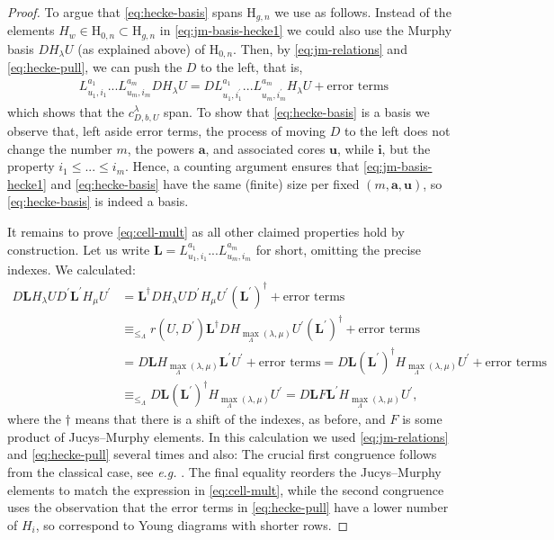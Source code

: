 \documentclass[a4paper,11pt]{amsart}
\newcommand{\eg}{\textsl{e.g.}}
\renewcommand{\dots}{\text{...}}
\newcommand{\setstuff}[1]{\mathrm{#1}}
\newcommand{\bsym}[1]{\boldsymbol{#1}}
\newcommand{\jm}{L}
\numberwithin{equation}{section}
\begin{document}
\begin{proof}
To argue that \eqref{eq:hecke-basis} spans
$\setstuff{H}_{g,n}$ we use \cite[Proposition 3.16]{Ma-hecke-schur} as follows.
Instead of the elements $H_{w}\in\setstuff{H}_{0,n}\subset
\setstuff{H}_{g,n}$ in \eqref{eq:jm-basis-hecke1} we could 
also use the Murphy basis $DH_{\lambda}U$ (as explained above) of $\setstuff{H}_{0,n}$. Then, by 
\eqref{eq:jm-relations} and \eqref{eq:hecke-pull}, we can push 
the $D$ to the left, that is, 
\begin{gather*}
\jm_{u_{1}^{},i_{1}}^{a_{1}}\dots 
\jm_{u_{m},i_{m}}^{a_{m}}DH_{\lambda}U
=D\jm_{u_{1},i_{1}^{\prime}}^{a_{1}}\dots 
\jm_{u_{m},i_{m}^{\prime}}^{a_{m}}H_{\lambda}U+\text{error terms}
\end{gather*} 
which shows that the $c_{D,b,U}^{\lambda}$ span.
To show that \eqref{eq:hecke-basis} is a basis we observe that,
left aside error terms, the process of moving $D$ to the left 
does not change the number $m$, 
the powers $\bsym{a}$, and associated cores $\bsym{u}$, while 
$\bsym{i}$, but the property $i_{1}\leq\dots\leq i_{m}$. Hence, 
a counting argument ensures that \eqref{eq:jm-basis-hecke1} and 
\eqref{eq:hecke-basis} have the same (finite) size per fixed 
$(m,\bsym{a},\bsym{u})$, 
so \eqref{eq:hecke-basis} is indeed a basis.

It remains to prove \eqref{eq:cell-mult} as all other claimed 
properties hold by construction. Let us write 
$\bsym{L}=\jm_{u_{1},i_{1}}^{a_{1}}\dots 
\jm_{u_{m},i_{m}}^{a_{m}}$ for short, omitting the precise indexes.
We calculated: 
\begin{align*}
D\bsym{L}H_{\lambda}U
D^{\prime}\bsym{L}^{\prime}H_{\mu}U^{\prime}
&=
\bsym{L}^{\dagger}DH_{\lambda}U
D^{\prime}H_{\mu}U^{\prime}(\bsym{L}^{\prime})^{\dagger}
+\text{error terms}
\\
&\equiv_{\leq_{\Lambda}}
r(U,D^{\prime})
\bsym{L}^{\dagger}DH_{\max_{\Lambda}(\lambda,\mu)}
U^{\prime}(\bsym{L}^{\prime})^{\dagger}
+\text{error terms}
\\
&=
D\bsym{L}H_{\max_{\Lambda}(\lambda,\mu)}
\bsym{L}^{\prime}U^{\prime}
+\text{error terms}
=
D\bsym{L}
(\bsym{L}^{\prime})^{\dagger}H_{\max_{\Lambda}(\lambda,\mu)}U^{\prime}
+\text{error terms}
\\
&\equiv_{\leq_{\Lambda}}
D\bsym{L}
(\bsym{L}^{\prime})^{\dagger}H_{\max_{\Lambda}(\lambda,\mu)}U^{\prime}
=
D\bsym{L}
F\bsym{L}^{\prime}H_{\max_{\Lambda}(\lambda,\mu)}U^{\prime}
,
\end{align*}
where the $\dagger$ means that there is 
a shift of the indexes, as before, and $F$ 
is some product of Jucys--Murphy elements. 
In this calculation we used 
\eqref{eq:jm-relations} 
and \eqref{eq:hecke-pull} several times and also:
The crucial first congruence 
follows from the classical case, see {\eg} \cite[Theorem 3.20]{Ma-hecke-schur}.
The final equality reorders the 
Jucys--Murphy elements to match the expression in 
\eqref{eq:cell-mult}, while the second congruence uses 
the observation that the error terms in \eqref{eq:hecke-pull} 
have a lower number of $H_{i}$, so correspond to Young diagrams with shorter rows.
\end{proof} 
\end{document}
